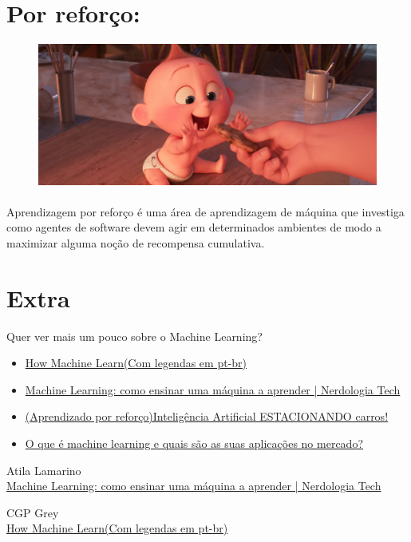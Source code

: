 \documentclass{article}
\begin{document}
    \section{Por reforço:}
    \begin{figure}[ht]
        \centering
        \includegraphics[scale = 0.2]{jack-jack-num-num-cookie_orig.png}
    \end{figure}

    \paragraph{}Aprendizagem por reforço é uma área de aprendizagem de máquina que investiga como agentes de software devem agir em determinados ambientes de modo a maximizar alguma noção de recompensa cumulativa.

    \section*{Extra}
    Quer ver mais um pouco sobre o Machine Learning?
    \begin{itemize}
        \item\href{https://www.youtube.com/watch?v=R9OHn5ZF4Uo&t}{How Machine Learn(Com legendas em pt-br)}
        \item\href{https://www.youtube.com/watch?v=mhe5e2B9bL8&t}{Machine Learning: como ensinar uma máquina a aprender | Nerdologia Tech}
        \item\href{https://www.youtube.com/watch?v=r8KWciNmEGw}{(Aprendizado por reforço)Inteligência Artificial ESTACIONANDO carros!} 
        \item\href{https://blog.wittel.com/o-que-e-machine-learning/}{O que é machine learning e quais são as suas aplicações no mercado?}
    \end{itemize}

    \clearpage
    \begin{thebibliography}{2}
    
    Atila Lamarino \\
    \href{https://www.youtube.com/watch?v=mhe5e2B9bL8&t}{Machine Learning: como ensinar uma máquina a aprender | Nerdologia Tech}

    CGP Grey \\
    \href{https://www.youtube.com/watch?v=R9OHn5ZF4Uo&t}{How Machine Learn(Com legendas em pt-br)}

    \end{thebibliography}    
\end{document}
